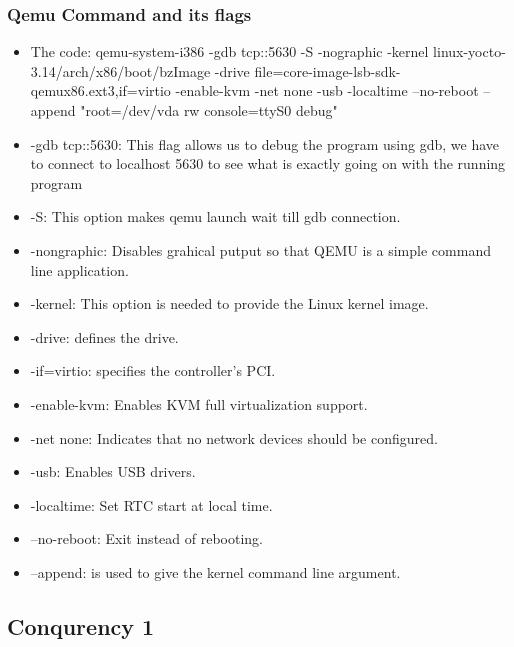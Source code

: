\documentclass[letterpaper,10pt,draftclsnofoot,onecolumn]{IEEEtran}
\begin{document}
\subsubsection*{Qemu Command and its flags} 
\begin{itemize}
	\item The code: qemu-system-i386 -gdb tcp::5630 -S -nographic -kernel linux-yocto-3.14/arch/x86/boot/bzImage -drive file=core-image-lsb-sdk-qemux86.ext3,if=virtio -enable-kvm -net none -usb -localtime --no-reboot --append "root=/dev/vda rw console=ttyS0 debug" 
	\item -gdb tcp::5630: This flag allows us to debug the program using gdb, we have to connect to localhost 5630 to see what is exactly going on with the running program 
	\item -S: This option makes qemu launch wait till gdb connection. 
	\item -nongraphic: Disables grahical putput so that QEMU is a simple command line application.
	\item -kernel: This option is needed to provide the Linux kernel image.
	\item -drive: defines the drive. 
	\item -if=virtio: specifies the controller's PCI. 
	\item -enable-kvm: Enables KVM full virtualization support. 
	\item -net none: Indicates that no network devices should be configured. 
	\item -usb: Enables USB drivers.
	\item -localtime: Set RTC start at local time. 
	\item --no-reboot: Exit instead of rebooting. 
	\item --append: is used to give the kernel command line argument. 
\end{itemize}

\subsection*{Conqurency 1}
\end{document}
